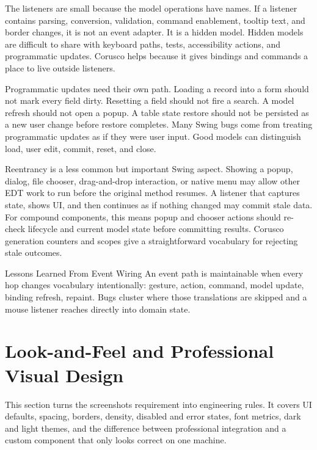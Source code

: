 The listeners are small because the model operations have names. If a listener
contains parsing, conversion, validation, command enablement, tooltip text,
and border changes, it is not an event adapter. It is a hidden model. Hidden
models are difficult to share with keyboard paths, tests, accessibility
actions, and programmatic updates. Corusco helps because it gives bindings and
commands a place to live outside listeners.

Programmatic updates need their own path. Loading a record into a form should
not mark every field dirty. Resetting a field should not fire a search. A
model refresh should not open a popup. A table state restore should not be
persisted as a new user change before restore completes. Many Swing bugs come
from treating programmatic updates as if they were user input. Good models
can distinguish load, user edit, commit, reset, and close.

Reentrancy is a less common but important Swing aspect. Showing a popup,
dialog, file chooser, drag-and-drop interaction, or native menu may allow
other EDT work to run before the original method resumes. A listener that
captures state, shows UI, and then continues as if nothing changed may commit
stale data. For compound components, this means popup and chooser actions
should re-check lifecycle and current model state before committing results.
Corusco generation counters and scopes give a straightforward vocabulary for
rejecting stale outcomes.

\begin{principlebox}{Lessons Learned From Event Wiring}
An event path is maintainable when every hop changes vocabulary intentionally:
gesture, action, command, model update, binding refresh, repaint. Bugs cluster
where those translations are skipped and a mouse listener reaches directly into
domain state.
\end{principlebox}

\section{Look-and-Feel and Professional Visual Design}

\begin{roadmapbox}
This section turns the screenshots requirement into engineering rules. It covers
UI defaults, spacing, borders, density, disabled and error states, font metrics,
dark and light themes, and the difference between professional integration and a
custom component that only looks correct on one machine.
\end{roadmapbox}

